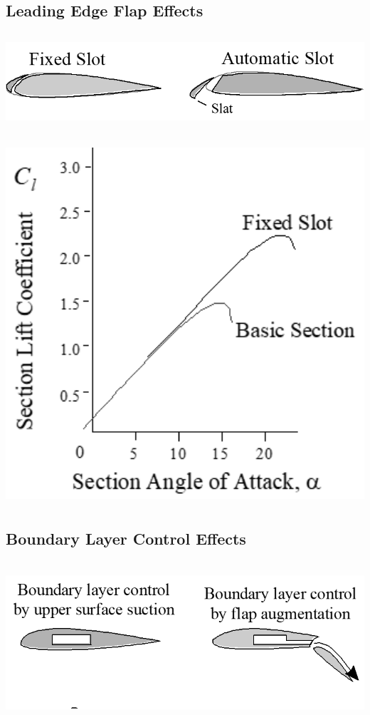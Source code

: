 \documentclass[
]{book}
\begin{document}
\hypertarget{leading-edge-flap-effects}{%
\subsection*{Leading Edge Flap Effects}\label{leading-edge-flap-effects}}

\includegraphics[width=6.385in,height=1.393in]{media/05/image20.png}

\includegraphics[width=5.4in,height=5.29in]{media/05/image21.png}

\hypertarget{boundary-layer-control-effects}{%
\subsection*{Boundary Layer Control Effects}\label{boundary-layer-control-effects}}

\includegraphics[width=6.294in,height=2.349in]{media/05/image22.png}
\end{document}

